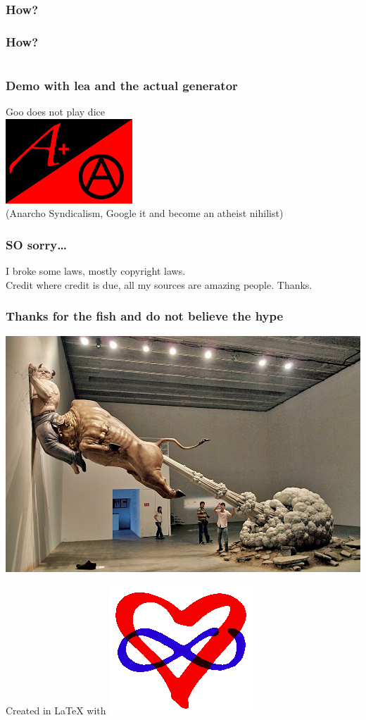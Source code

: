 \documentclass[a4paper]{beamer}
\begin{document}
\begin{frame}
\frametitle{How?}
\end{frame}

\begin{frame}
\frametitle{How?}
\inputminted[firstline=1, lastline=6, gobble=0, linenos, mathescape, bgcolor=bg, numbersep=8pt, frame=lines, framesep=3mm, fontsize=\scriptsize]{python}{code/bh.py}
\end{frame}

\begin{frame}
\frametitle{Demo with lea and the actual generator}
Goo does not play dice
\\
\includegraphics[scale=0.60]{img/mjr_anarchist_flag.jpg}
\\
(Anarcho Syndicalism, Google it and become an atheist nihilist)
\end{frame}

\begin{frame}
\frametitle{SO sorry\ldots}
I broke some laws, mostly copyright laws.
\\
Credit where credit is due, all my sources are amazing people. Thanks.
\end{frame}

\begin{frame}
\frametitle{Thanks for the fish and do not believe the hype}
\begin{center}
\includegraphics[scale=1.00]{img/bullshit-sculpture.jpg}
\end{center}
Created in \LaTeX{} with \includegraphics[scale=0.05]{img/polyamory.png}
\end{frame}
\end{document}
